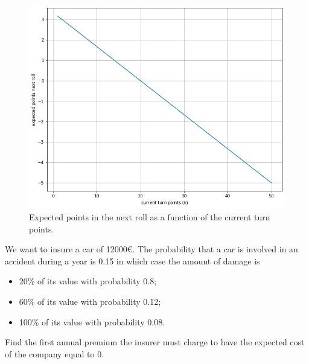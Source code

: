 \begin{solution}
\begin{figure}[htbp]
	\begin{center}
		\includegraphics[width=0.7\linewidth]{figures/greedy_pig_expectation}
	\end{center}
\caption{Expected points in the next roll as a function of the current turn points.}
\label{fig:greedy_pig_expec}
\end{figure}
\end{solution}



%
%
%
%
%
%
%
%
%
%
%
%
\begin{question}
We want to insure a car of 12000\euro. The probability that a car is involved in an accident during a year is 0.15 in which case the amount of damage is

\begin{itemize}
\tightlist
\item 20\% of its value with probability 0.8;
\item 60\% of its value with probability 0.12;
\item 100\% of its value with probability 0.08.
\end{itemize}
Find the first annual premium the insurer must charge to have the expected cost of the company equal to 0.
\end{question}


